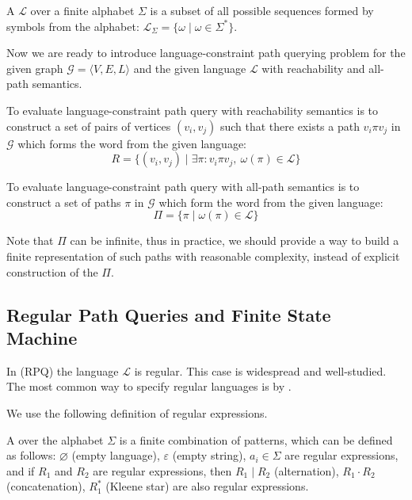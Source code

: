 \begin{definition}
A  $\mathcal{L}$ over a finite alphabet $\Sigma$ is a subset of all possible sequences formed by symbols from the alphabet: $\mathcal{L}_{\Sigma} = \{\omega \mid \omega \in \Sigma^*\}$.
\end{definition}

Now we are ready to introduce language-constraint path querying problem for the given graph  $\mathcal{G} = \langle V,E,L \rangle$ and the given language $\mathcal{L}$ with reachability and all-path semantics.

\begin{definition}
To evaluate language-constraint path query with reachability semantics is to construct a set of pairs of vertices $(v_i,v_j)$ such that there exists a path $v_i \pi v_j$ in $\mathcal{G}$ which forms the word from the given language:
$$
R = \{(v_i,v_j) \mid \exists \pi: v_i \pi v_j, \ \omega(\pi) \in \mathcal{L} \}
$$
\end{definition}

\begin{definition}
To evaluate language-constraint path query with all-path semantics is to construct a set of paths $\pi$ in $\mathcal{G}$ which form the word from the given language:
$$
\Pi = \{ \pi \mid \omega(\pi) \in \mathcal{L}\}
$$
\end{definition}

Note that $\Pi$ can be infinite, thus in practice, we should provide a way to build a finite representation of such paths with reasonable complexity, instead of explicit construction of the $\Pi$.

\subsection{Regular Path Queries and Finite State Machine}

In  (RPQ) the language $\mathcal{L}$ is regular.
This case is widespread and well-studied.
The most common way to specify regular languages is by .

We use the following definition of regular expressions.
\begin{definition}
A  over the alphabet $\Sigma$ is a finite combination of patterns, which can be defined as follows: $\varnothing$ (empty language), $\varepsilon$ (empty string), $a_i \in \Sigma$ are regular expressions, and if $R_1$ and $R_2$ are regular expressions, then $R_1 \mid R_2$ (alternation), $R_1 \cdot R_2$ (concatenation), $R_1^*$ (Kleene star) are also regular expressions.
\end{definition}

